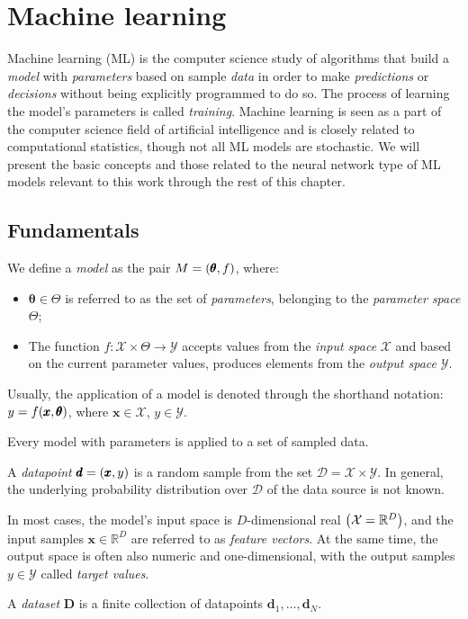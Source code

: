 \section{Machine learning}
Machine learning (ML) is the computer science study of algorithms that build a \emph{model} with \emph{parameters} based on sample \emph{data} in order to make \emph{predictions} or \emph{decisions} without being explicitly programmed to do so. The process of learning the model's parameters is called \emph{training}. Machine learning is seen as a part of the computer science field of artificial intelligence and is closely related to computational statistics, though not all ML models are stochastic. We will present the basic concepts and those related to the neural network type of ML models relevant to this work through the rest of this chapter. 

\subsection{Fundamentals}

\begin{definition}
We define a \emph{model} as the pair $M = \mathopen{}\left(\pmb{\theta}, f\right)$, where:
\begin{itemize}
\item $\pmb{\theta} \in \Theta$ is referred to as the set of \emph{parameters}, belonging to the \emph{parameter space} $\Theta$;
\item The function $f: \mathcal{X} \times \Theta \to \mathcal{Y}$ accepts values from the \emph{input space} $\mathcal{X}$ and based on the current parameter values, produces elements from the \emph{output space} $\mathcal{Y}$.
\end{itemize}
Usually, the application of a model is denoted through the shorthand notation:\\ $y = f\mathopen{}\left(\pmb{x}, \pmb{\theta}\right)$, where $\pmb{x} \in \mathcal{X}$, $y \in \mathcal{Y}$.
\end{definition}

Every model with parameters is applied to a set of sampled data.

\begin{definition}
A \emph{datapoint} $\pmb{d}=\mathopen{}\left(\pmb{x}, y\right)$ is a random sample from the set $\mathcal{D} = \mathcal{X} \times \mathcal{Y}$. In general, the underlying probability distribution over $\mathcal{D}$ of the data source is not known. 

In most cases, the model's input space is $D$-dimensional real $\mathopen{}\left(\mathcal{X}=\mathbb{R}^D\right)$, and the input samples $\pmb{x} \in \mathbb{R}^D$ are referred to as \emph{feature vectors}. At the same time, the output space is often also numeric and one-dimensional, with the output samples $y \in \mathcal{Y}$ called \emph{target values}.  

A \emph{dataset} $\pmb{D}$ is a finite collection of datapoints $\pmb{d}_1,\dots,\pmb{d}_N$.
\end{definition}

